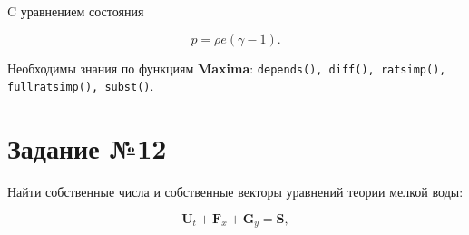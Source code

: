 %

	C уравнением состояния

	\begin{equation}
		p = \rho e \left( \gamma - 1 \right).
	\end{equation}

	
	Необходимы знания по функциям \textbf{Maxima}: {\tt depends(), diff(), ratsimp(), fullratsimp(), subst()}.

\section*{Задание №12}

	Найти собственные числа и собственные векторы уравнений теории мелкой воды:
	
	\begin{equation}
		\mathbf{U}_{t} + \mathbf{F}_{x} + \mathbf{G}_{y} = \mathbf{S},
	\end{equation}
	
